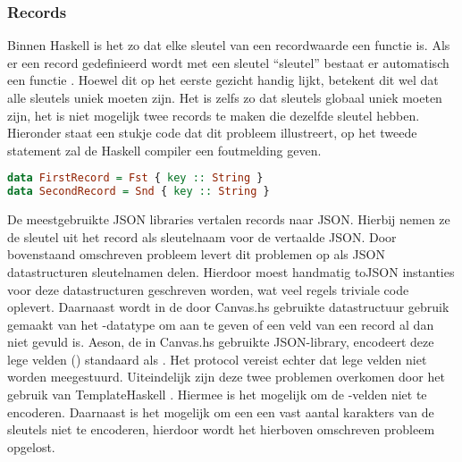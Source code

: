 \subsubsection{Records}
Binnen Haskell is het zo dat elke sleutel van een recordwaarde een functie is. Als er een record gedefinieerd wordt met een sleutel ``sleutel'' bestaat er automatisch een functie . Hoewel dit op het eerste gezicht handig lijkt, betekent dit wel dat alle sleutels uniek moeten zijn. Het is zelfs zo dat sleutels globaal uniek moeten zijn, het is niet mogelijk twee records te maken die dezelfde sleutel hebben. Hieronder staat een stukje code dat dit probleem illustreert, op het tweede statement zal de Haskell compiler een foutmelding geven.

\begin{lstlisting}[language=Haskell]
data FirstRecord = Fst { key :: String }
data SecondRecord = Snd { key :: String }
\end{lstlisting}

De meestgebruikte JSON libraries vertalen records naar JSON. Hierbij nemen ze de sleutel uit het record als sleutelnaam voor de vertaalde JSON. Door bovenstaand omschreven probleem levert dit problemen op als JSON datastructuren sleutelnamen delen. Hierdoor moest handmatig toJSON instanties voor deze datastructuren geschreven worden, wat veel regels triviale code oplevert. Daarnaast wordt in de door Canvas.hs gebruikte datastructuur gebruik gemaakt van het -datatype om aan te geven of een veld van een record al dan niet gevuld is. Aeson, de in Canvas.hs gebruikte JSON-library, encodeert deze lege velden () standaard als . Het protocol vereist echter dat lege velden niet worden meegestuurd. Uiteindelijk zijn deze twee problemen overkomen door het gebruik van TemplateHaskell \cite{AesonTH}. Hiermee is het mogelijk om de -velden niet te encoderen. Daarnaast is het mogelijk om een een vast aantal karakters van de sleutels niet te encoderen, hierdoor wordt het hierboven omschreven probleem opgelost. 